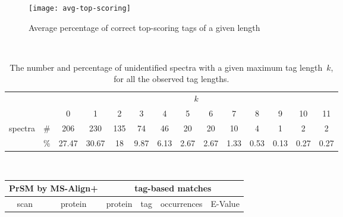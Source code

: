 \documentclass{article}[12pt]
\begin{document}
\begin{figure}
  \begin{center}
\texttt{[image: avg-top-scoring]}
\end{center}
\caption{Average percentage of correct top-scoring tags of a given length}
  \label{fig:avg-top-scoring}
\end{figure}





\begin{landscape}

\begin{table}[h]
\vspace{3mm}\
{\centering
\begin{center}
\begin{tabular}{|c|c|
c|c|c|c|c|c|c|c|c|c|c|c|}
  \hline
  \multicolumn{2}{|c|}{} & \multicolumn{ 12}{|c|}{$k$} \\
  \cline{3-14}
  \multicolumn{2}{|c|}{} 
 & 0 & 1 & 2 & 3 & 4 & 5 & 6 & 7 & 8 & 9 & 10 & 11\\
  \hline
  \multirow{2}{*}{spectra} & \#
 & 206 & 230 & 135 & 74 & 46 & 20 & 20 & 10 & 4 & 1 & 2 & 2\\
   & \%
 & 27.47 & 30.67 & 18 & 9.87 & 6.13 & 2.67 & 2.67 & 1.33 & 0.53 & 0.13 & 0.27 & 0.27\\
  \hline
\end{tabular}
\end{center}
\par}
\centering
\caption{The number and percentage of unidentified spectra with a given maximum tag length~$k$, for all the observed tag lengths.}
\vspace{3mm}
\label{table:unident-tags}
\end{table}


\begin{table}[h]\footnotesize
\vspace{3mm}\
{\centering
\begin{center}
\begin{tabular}{|c|c||c|c|c|c|}
  \hline
  \multicolumn{2}{|c||}{PrSM by MS-Align+} & \multicolumn{4}{|c|}{tag-based matches} \\
  \hline
  scan & protein & protein & tag & occurrences & E-Value\\


\end{tabular}
\end{center}}
\end{table}
\end{landscape}
\end{document}

